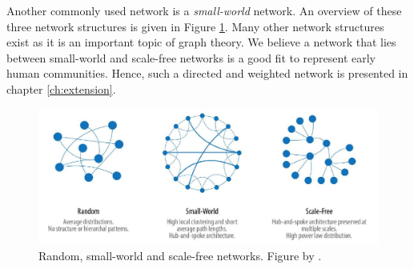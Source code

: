 Another commonly used network is a \textit{small-world} network.
An overview of these three network structures is given in Figure \ref{fig:network_structures}.
Many other network structures exist as it is an important topic of graph theory.
We believe a network that lies between small-world and scale-free networks is a good fit to represent early human communities.
Hence, such a directed and weighted network is presented in chapter \ref{ch:extension}.


\begin{figure}[H]
    \centering
    \includegraphics[width=\linewidth]{images/literature/network_structures.jpeg}
    \captionsetup{width=0.9\linewidth}
    \captionsetup{justification=centering}
    \caption{Random, small-world and scale-free networks. Figure by \citet{graphsfigure}.}
    \label{fig:network_structures}
\end{figure}

